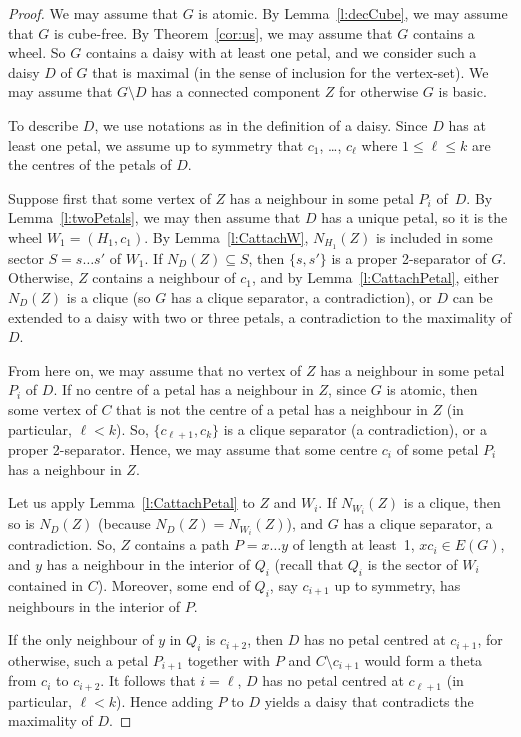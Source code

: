 \documentclass[11pt]{article}
\newcommand{\sm}{\setminus}
\begin{document}
\decomp*

\begin{proof}
  We may assume that $G$ is atomic.  By Lemma~\ref{l:decCube}, we may assume that $G$ is cube-free.  By Theorem~\ref{cor:us}, we may assume that $G$ contains a wheel. So $G$ contains a daisy with at least one petal, and we consider such a daisy $D$ of $G$ that is maximal (in the sense of inclusion for the vertex-set).  We may assume that $G\sm D$ has a connected component $Z$ for otherwise $G$ is basic.

To describe $D$, we use notations as in the definition of a daisy.
Since $D$ has at least one petal, we assume up to
symmetry that $c_1$, \dots, $c_\ell$ where $1 \leq \ell \leq k$ are the centres of the petals of $D$.

Suppose first that some vertex of $Z$ has a neighbour in some petal $P_i$ of~$D$.  By Lemma~\ref{l:twoPetals}, we may then assume that $D$ has a unique petal, so it is the wheel $W_1 = (H_1, c_1)$.  
By Lemma~\ref{l:CattachW}, $N_{H_1}(Z)$ is included
in some sector $S = s \dots s'$ of $W_1$.  If $N_{D}(Z) \subseteq S$, then $\{s, s'\}$ is a proper 2-separator of $G$.  Otherwise, $Z$ contains a neighbour of $c_1$, and by Lemma~\ref{l:CattachPetal},
either $N_{D}(Z)$ is a clique (so $G$ has a clique separator, a contradiction), or $D$ can be extended to a daisy with two or three petals, a contradiction to the maximality of $D$.

From here on, we may assume that no vertex of $Z$ has a neighbour in
some petal $P_i$ of $D$.  If no centre of a petal has a neighbour in $Z$,
since $G$ is atomic, then some vertex of $C$ that is not the centre of
a petal has a neighbour in $Z$ (in particular, $\ell < k$).  So,
$\{c_{\ell + 1}, c_k\}$ is a clique separator (a contradiction), or a
proper 2-separator.  Hence, we may assume that some centre $c_i$ of
some petal $P_i$ has a neighbour in $Z$.


Let us apply Lemma~\ref{l:CattachPetal} to $Z$ and $W_i$. If
$N_{W_i}(Z)$ is a clique, then so is $N_D(Z)$ (because
$N_D(Z) = N_{W_i}(Z)$), and $G$ has a clique separator, a
contradiction.  So, $Z$ contains a path $P = x \dots y$ of length at
least~1, $xc_i\in E(G)$, and $y$ has a neighbour in the interior of
$Q_i$ (recall that $Q_i$ is the sector of $W_i$ contained in $C$).
Moreover, some end of $Q_i$, say $c_{i+1}$ up 
to symmetry, has neighbours in the interior
of $P$.

If the only neighbour of $y$ in $Q_i$ is $c_{i+2}$, then $D$ has no
petal centred at $c_{i+1}$, for otherwise, such a petal $P_{i+1}$
together with $P$ and $C\sm c_{i+1}$ would form a theta from $c_i$ to
$c_{i+2}$.  It follows that $i=\ell$, $D$ has no petal centred at
$c_{\ell +1}$ (in particular, $\ell < k$).  Hence adding $P$ to $D$
yields a daisy that contradicts the maximality of $D$.


\end{proof}
\end{document}
